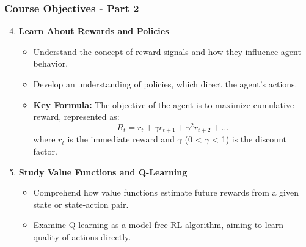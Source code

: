 \documentclass[aspectratio=169]{beamer}
\begin{document}
\begin{frame}[fragile]
    \frametitle{Course Objectives - Part 2}
    \begin{enumerate}
        \setcounter{enumi}{3} %
        \item \textbf{Learn About Rewards and Policies}
        \begin{itemize}
            \item Understand the concept of reward signals and how they influence agent behavior.
            \item Develop an understanding of policies, which direct the agent's actions.
            \item \textbf{Key Formula:} The objective of the agent is to maximize cumulative reward, represented as:
            \begin{equation}
                R_t = r_t + \gamma r_{t+1} + \gamma^2 r_{t+2} + \ldots
            \end{equation}
            where \( r_t \) is the immediate reward and \( \gamma \) (0 < \( \gamma \) < 1) is the discount factor.
        \end{itemize}

        \item \textbf{Study Value Functions and Q-Learning}
        \begin{itemize}
            \item Comprehend how value functions estimate future rewards from a given state or state-action pair.
            \item Examine Q-learning as a model-free RL algorithm, aiming to learn quality of actions directly.
        \end{itemize}
    \end{enumerate}
\end{frame}
\end{document}

